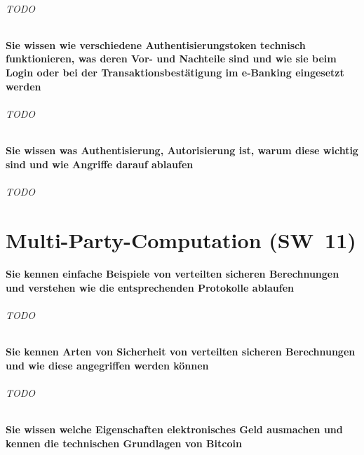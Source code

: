\documentclass[10pt,a4paper]{article}
\begin{document}
\paragraph*{TODO}
\subsection*{Sie wissen wie verschiedene Authentisierungstoken technisch funktionieren, was deren Vor- und Nachteile sind und wie sie beim Login oder bei der Transaktionsbestätigung im e-Banking eingesetzt werden}
\paragraph*{TODO}
\subsection*{Sie wissen was Authentisierung, Autorisierung ist, warum diese wichtig sind und wie Angriffe darauf ablaufen}
\paragraph*{TODO}

\part{Multi-Party-Computation (SW~11)}
\subsection*{Sie kennen einfache Beispiele von verteilten sicheren Berechnungen und verstehen wie die entsprechenden Protokolle ablaufen}
\paragraph*{TODO}
\subsection*{Sie kennen Arten von Sicherheit von verteilten sicheren Berechnungen und wie diese angegriffen werden können}
\paragraph*{TODO}
\subsection*{Sie wissen welche Eigenschaften elektronisches Geld ausmachen und kennen die technischen Grundlagen von Bitcoin}
\end{document}

